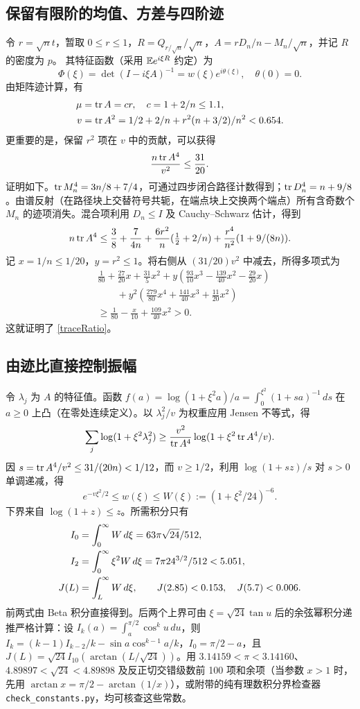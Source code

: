 \documentclass[11pt,a4paper,fontset=fandol]{ctexart}
\begin{document}
\subsection{保留有限阶的均值、方差与四阶迹}
令 $r=\sqrt n t$，暂取 $0\le r\le1$，$R=Q_{r/\sqrt n}/\sqrt n$，$A=rD_n/n-M_n/\sqrt n$，并记 $R$ 的密度为 $p$。
其特征函数（采用 $\mathbb E e^{i\xi R}$ 约定）为
\[\Phi(\xi)=\det(I-i\xi A)^{-1}=w(\xi)e^{i\theta(\xi)},\quad \theta(0)=0.\]
由矩阵迹计算，有
\begin{align*}
\mu&=\operatorname{tr} A=cr,\quad c=1+2/n\le1.1,\\
v&=\operatorname{tr} A^2=1/2+2/n+r^2(n+3/2)/n^2<0.654.
\end{align*}
更重要的是，保留 $r^2$ 项在 $v$ 中的贡献，可以获得
\begin{equation}\label{traceRatio}
\frac{n\operatorname{tr} A^4}{v^2}\le\frac{31}{20}.
\end{equation}
证明如下。$\operatorname{tr} M_n^4=3n/8+7/4$，可通过四步闭合路径计数得到；$\operatorname{tr} D_n^4=n+9/8$。由谱反射（在路径块上交替符号共轭，在端点块上交换两个端点）所有含奇数个 $M_n$ 的迹项消失。混合项利用 $D_n\le I$ 及 Cauchy--Schwarz 估计，得到
\[n\operatorname{tr} A^4\le\frac38+\frac7{4n}+\frac{6r^2}{n}(\tfrac12+2/n)+\frac{r^4}{n^2}(1+9/(8n)).\]
记 $x=1/n\le1/20$，$y=r^2\le1$。将右侧从 $(31/20)v^2$ 中减去，所得多项式为
\begin{align*}
&\tfrac1{80}+\tfrac{27}{20}x+\tfrac{31}{5}x^2
 +y(\tfrac{93}{10}x^3-\tfrac{139}{40}x^2-\tfrac{29}{20}x)\\
&\qquad +y^2(\tfrac{279}{80}x^4+\tfrac{141}{40}x^3+\tfrac{11}{20}x^2)\\
&\ge \tfrac1{80}-\tfrac{x}{10}+\tfrac{109}{40}x^2>0.
\end{align*}
这就证明了 \eqref{traceRatio}。
\subsection{由迹比直接控制振幅}
令 $\lambda_j$ 为 $A$ 的特征值。函数 $f(a)=\log(1+\xi^2a)/a=\int_0^{\xi^2}(1+sa)^{-1}\,ds$ 在 $a\ge0$ 上凸（在零处连续定义）。以 $\lambda_j^2/v$ 为权重应用 Jensen 不等式，得
\[\sum_j\log(1+\xi^2\lambda_j^2)\ge\frac{v^2}{\operatorname{tr} A^4}\log(1+\xi^2\operatorname{tr} A^4/v).\]
因 $s=\operatorname{tr} A^4/v^2\le31/(20n)<1/12$，而 $v\ge1/2$，利用 $\log(1+sz)/s$ 对 $s>0$ 单调递减，得
\begin{equation}\label{amp}
 e^{-v\xi^2/2}\le w(\xi)\le W(\xi):=(1+\xi^2/24)^{-6}.
\end{equation}
下界来自 $\log(1+z)\le z$。所需积分只有
\begin{align}
 I_0&=\int_0^\infty W\,d\xi=63\pi\sqrt{24}/512,\notag\\
 I_2&=\int_0^\infty \xi^2W\,d\xi=7\pi 24^{3/2}/512<5.051,\notag\\
 J(L)&=\int_L^\infty W\,d\xi,\qquad J(2.85)<0.153,\quad J(5.7)<0.006.\label{integrals}
\end{align}
前两式由 Beta 积分直接得到。后两个上界可由 $\xi=\sqrt{24}\tan u$ 后的余弦幂积分递推严格计算：设 $I_k(a)=\int_a^{\pi/2}\cos^k u\,du$，则 $I_k=(k-1)I_{k-2}/k-\sin a\cos^{k-1}a/k$，$I_0=\pi/2-a$，且 $J(L)=\sqrt{24}I_{10}(\arctan(L/\sqrt{24}))$。用 $3.14159<\pi<3.14160$、$4.89897<\sqrt{24}<4.89898$ 及反正切交错级数前 100 项和余项（当参数 $x>1$ 时，先用 $\arctan x=\pi/2-\arctan(1/x)$），或附带的纯有理数积分界检查器 \texttt{check\_constants.py}，均可核查这些常数。
\end{document}
